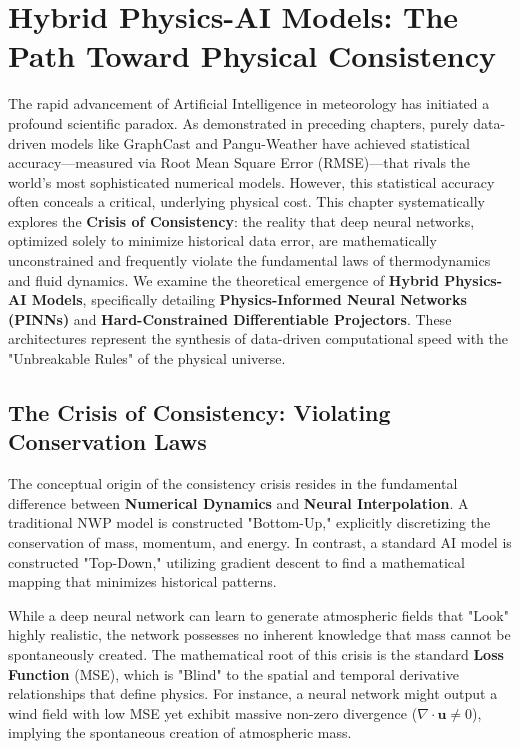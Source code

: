\chapter{Hybrid Physics-AI Models: The Path Toward Physical Consistency}

The rapid advancement of Artificial Intelligence in meteorology has initiated a profound scientific paradox. As demonstrated in preceding chapters, purely data-driven models like GraphCast and Pangu-Weather have achieved statistical accuracy—measured via Root Mean Square Error (RMSE)—that rivals the world's most sophisticated numerical models. However, this statistical accuracy often conceals a critical, underlying physical cost. This chapter systematically explores the \textbf{Crisis of Consistency}: the reality that deep neural networks, optimized solely to minimize historical data error, are mathematically unconstrained and frequently violate the fundamental laws of thermodynamics and fluid dynamics. We examine the theoretical emergence of \textbf{Hybrid Physics-AI Models}, specifically detailing \textbf{Physics-Informed Neural Networks (PINNs)} and \textbf{Hard-Constrained Differentiable Projectors}. These architectures represent the synthesis of data-driven computational speed with the "Unbreakable Rules" of the physical universe.

\section{The Crisis of Consistency: Violating Conservation Laws}

The conceptual origin of the consistency crisis resides in the fundamental difference between \textbf{Numerical Dynamics} and \textbf{Neural Interpolation}. A traditional NWP model is constructed "Bottom-Up," explicitly discretizing the conservation of mass, momentum, and energy. In contrast, a standard AI model is constructed "Top-Down," utilizing gradient descent to find a mathematical mapping that minimizes historical patterns. 

While a deep neural network can learn to generate atmospheric fields that "Look" highly realistic, the network possesses no inherent knowledge that mass cannot be spontaneously created. The mathematical root of this crisis is the standard \textbf{Loss Function} (MSE), which is "Blind" to the spatial and temporal derivative relationships that define physics. For instance, a neural network might output a wind field with low MSE yet exhibit massive non-zero divergence ($\nabla \cdot \mathbf{u} \neq 0$), implying the spontaneous creation of atmospheric mass. 

